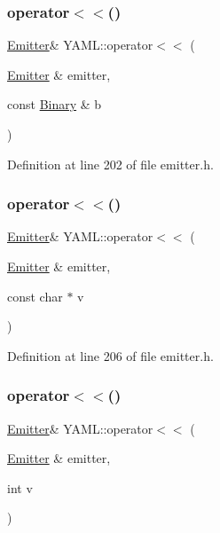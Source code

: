 \subsubsection{\texorpdfstring{operator$<$$<$()}{operator<<()}\hspace{0.1cm}{\footnotesize\ttfamily [21/35]}}
{\footnotesize\ttfamily \mbox{\hyperlink{class_y_a_m_l_1_1_emitter}{Emitter}}\& Y\+A\+M\+L\+::operator$<$$<$ (\begin{DoxyParamCaption}\item[{\mbox{\hyperlink{class_y_a_m_l_1_1_emitter}{Emitter}} \&}]{emitter,  }\item[{const \mbox{\hyperlink{class_y_a_m_l_1_1_binary}{Binary}} \&}]{b }\end{DoxyParamCaption})\hspace{0.3cm}{\ttfamily [inline]}}



Definition at line 202 of file emitter.\+h.

\mbox{\label{namespace_y_a_m_l_aafd6b671140088225a840a365d62906e}} 
\subsubsection{\texorpdfstring{operator$<$$<$()}{operator<<()}\hspace{0.1cm}{\footnotesize\ttfamily [22/35]}}
{\footnotesize\ttfamily \mbox{\hyperlink{class_y_a_m_l_1_1_emitter}{Emitter}}\& Y\+A\+M\+L\+::operator$<$$<$ (\begin{DoxyParamCaption}\item[{\mbox{\hyperlink{class_y_a_m_l_1_1_emitter}{Emitter}} \&}]{emitter,  }\item[{const char $\ast$}]{v }\end{DoxyParamCaption})\hspace{0.3cm}{\ttfamily [inline]}}



Definition at line 206 of file emitter.\+h.

\mbox{\label{namespace_y_a_m_l_ad478aa51ef7f3841147a53b93f40fd0c}} 
\subsubsection{\texorpdfstring{operator$<$$<$()}{operator<<()}\hspace{0.1cm}{\footnotesize\ttfamily [23/35]}}
{\footnotesize\ttfamily \mbox{\hyperlink{class_y_a_m_l_1_1_emitter}{Emitter}}\& Y\+A\+M\+L\+::operator$<$$<$ (\begin{DoxyParamCaption}\item[{\mbox{\hyperlink{class_y_a_m_l_1_1_emitter}{Emitter}} \&}]{emitter,  }\item[{int}]{v }\end{DoxyParamCaption})\hspace{0.3cm}{\ttfamily [inline]}}



